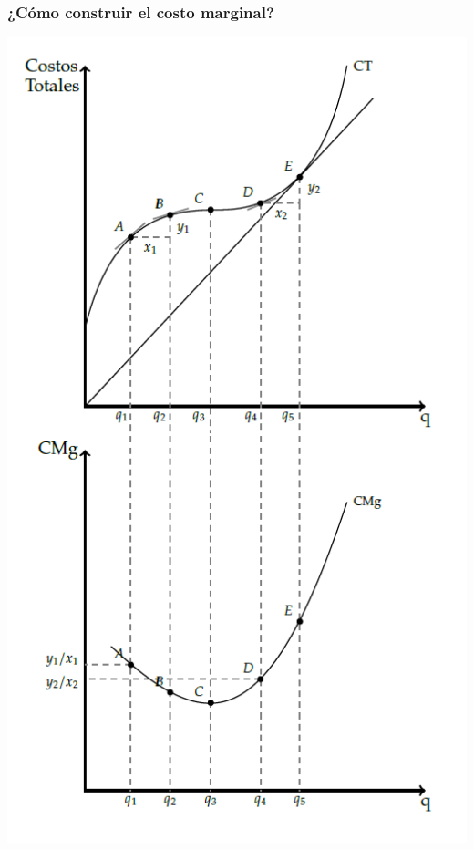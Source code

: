 \documentclass{beamer}
\begin{document}
\begin{frame}
\frametitle{¿Cómo construir el costo marginal?}
\centering
\includegraphics[scale=0.9]{../Figures/Contruyendocmg.png}
\end{frame}
\end{document}
